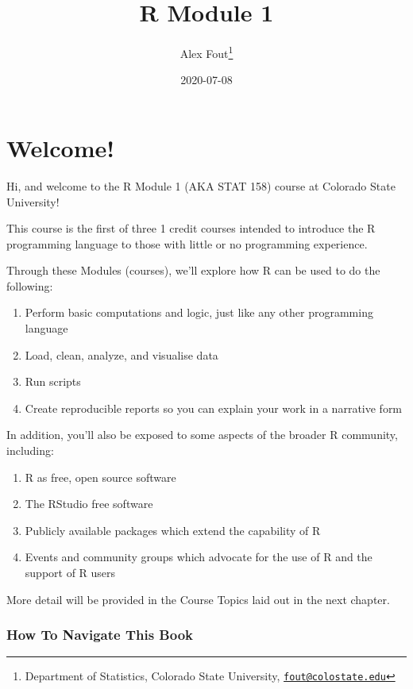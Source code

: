 \documentclass[
]{article}
\title{R Module 1}
\author{Alex Fout\footnote{Department of Statistics, Colorado State University, \href{mailto:fout@colostate.edu}{\nolinkurl{fout@colostate.edu}}}}
\date{2020-07-08}
\providecommand{\tightlist}{%
  \setlength{\itemsep}{0pt}\setlength{\parskip}{0pt}}
\begin{document}
\maketitle

{
\setcounter{tocdepth}{2}
\tableofcontents
}
\hypertarget{welcome}{%
\section{Welcome!}\label{welcome}}

Hi, and welcome to the R Module 1 (AKA STAT 158) course at Colorado State University!

This course is the first of three 1 credit courses intended to introduce the R programming language to those with little or no programming experience.

Through these Modules (courses), we'll explore how R can be used to do the following:

\begin{enumerate}
\def\labelenumi{\arabic{enumi}.}
\tightlist
\item
  Perform basic computations and logic, just like any other programming language
\item
  Load, clean, analyze, and visualise data
\item
  Run scripts
\item
  Create reproducible reports so you can explain your work in a narrative form
\end{enumerate}

In addition, you'll also be exposed to some aspects of the broader R community, including:

\begin{enumerate}
\def\labelenumi{\arabic{enumi}.}
\tightlist
\item
  R as free, open source software
\item
  The RStudio free software
\item
  Publicly available packages which extend the capability of R
\item
  Events and community groups which advocate for the use of R and the support of R users
\end{enumerate}

More detail will be provided in the Course Topics laid out in the next chapter.

\hypertarget{how-to-navigate-this-book}{%
\subsubsection{How To Navigate This Book}\label{how-to-navigate-this-book}}
\end{document}
